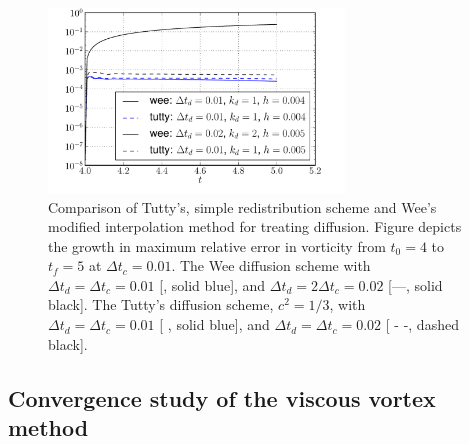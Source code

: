 	\begin{figure}[!b]
	\centering
	\includegraphics[width=0.7\textwidth]{figures/lagrangian/lambOseen_diffusionMethod_comparison_compressed.pdf}
	\caption{Comparison of Tutty's, simple redistribution scheme and Wee's modified interpolation method for treating diffusion. Figure depicts the growth in maximum relative error in vorticity from $t_0=4$ to $t_f=5$ at $\Delta t_c = 0.01$. The Wee diffusion scheme with $\Delta t_d = \Delta t_c = 0.01$ [{\color{plotBlue}{---}}, solid blue], and $\Delta t_d = 2 \Delta t_c = 0.02$ [---, solid black]. The Tutty's diffusion scheme, $c^2 = 1/3$, with $\Delta t_d = \Delta t_c = 0.01$ [ {\color{plotBlue}{- -}}, solid blue], and $\Delta t_d = \Delta t_c = 0.02$ [ - -, dashed black].}
	\label{fig:lambOseen_diffusionMethod_comparison_compressed}
	\end{figure}

\subsection{Convergence study of the viscous vortex method}

